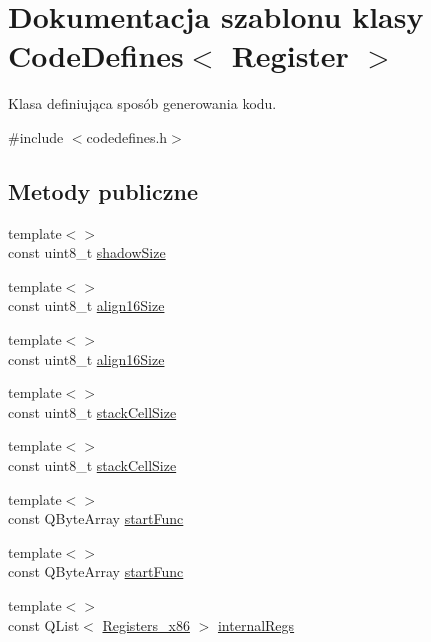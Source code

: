 \hypertarget{class_code_defines}{\section{Dokumentacja szablonu klasy Code\-Defines$<$ Register $>$}
\label{class_code_defines}
}


Klasa definiująca sposób generowania kodu.  




{\ttfamily \#include $<$codedefines.\-h$>$}

\subsection*{Metody publiczne}
\begin{DoxyCompactItemize}
\item 
{\footnotesize template$<$$>$ }\\const uint8\-\_\-t \hyperlink{class_code_defines_a20358aed4dbfb9a22a8ecd61e482cfa1}{shadow\-Size}
\item 
{\footnotesize template$<$$>$ }\\const uint8\-\_\-t \hyperlink{class_code_defines_ac7974a0b7b8e7f307536800ac146359d}{align16\-Size}
\item 
{\footnotesize template$<$$>$ }\\const uint8\-\_\-t \hyperlink{class_code_defines_ae2a02505b45aae48ac8d2eb0ae014fe5}{align16\-Size}
\item 
{\footnotesize template$<$$>$ }\\const uint8\-\_\-t \hyperlink{class_code_defines_a4d91cad6a972b05bd4156cb00552f39e}{stack\-Cell\-Size}
\item 
{\footnotesize template$<$$>$ }\\const uint8\-\_\-t \hyperlink{class_code_defines_a770bb8bf2208da3fd8d758966c23511e}{stack\-Cell\-Size}
\item 
{\footnotesize template$<$$>$ }\\const Q\-Byte\-Array \hyperlink{class_code_defines_a5491865f96eec40ff6594702879b0fdb}{start\-Func}
\item 
{\footnotesize template$<$$>$ }\\const Q\-Byte\-Array \hyperlink{class_code_defines_a8691301353c7786113939b5aa5925f09}{start\-Func}
\item 
{\footnotesize template$<$$>$ }\\const Q\-List$<$ \hyperlink{codedefines_8h_a0f84efe4ca4d99203713a78bd6e8c82e}{Registers\-\_\-x86} $>$ \hyperlink{class_code_defines_accadab674c6c55403b54ffb679ccdf62}{internal\-Regs}

\end{DoxyCompactItemize}

